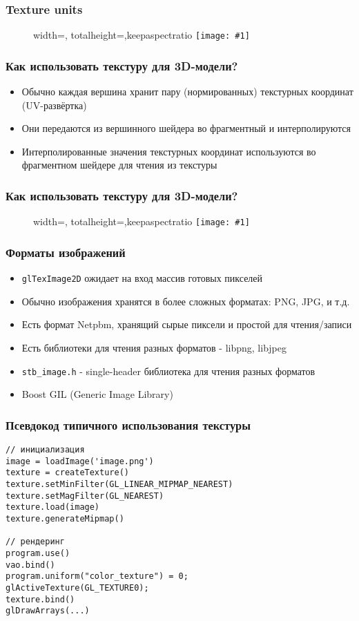 \documentclass{beamer}
\newcommand{\slideimage}[1]{
  \begin{figure}
    \begin{adjustbox}{width=\textwidth, totalheight=\textheight-2\baselineskip-2\baselineskip,keepaspectratio}
      \texttt{[image: \#1]}
    \end{adjustbox}
  \end{figure}
}
\begin{document}
\begin{frame}[fragile]
\frametitle{Texture units}
\slideimage{texture_units.png}
\end{frame}

\begin{frame}[fragile]
\frametitle{Как использовать текстуру для 3D-модели?}
\begin{itemize}
\item Обычно каждая вершина хранит пару (нормированных) текстурных координат (UV-развёртка)
\pause
\item Они передаются из вершинного шейдера во фрагментный и интерполируются
\pause
\item Интерполированные значения текстурных координат используются во фрагментном шейдере для чтения из текстуры
\end{itemize}
\end{frame}

\begin{frame}[fragile]
\frametitle{Как использовать текстуру для 3D-модели?}
\slideimage{uvs.png}
\end{frame}

\begin{frame}[fragile]
\frametitle{Форматы изображений}
\begin{itemize}
\item \verb|glTexImage2D| ожидает на вход массив готовых пикселей
\pause
\item Обычно изображения хранятся в более сложных форматах: PNG, JPG, и т.д.
\pause
\item Есть формат Netpbm, хранящий сырые пиксели и простой для чтения/записи
\pause
\item Есть библиотеки для чтения разных форматов - libpng, libjpeg
\pause
\item \verb|stb_image.h| - single-header библиотека для чтения разных форматов
\pause
\item Boost GIL (Generic Image Library)
\end{itemize}
\end{frame}

\begin{frame}[fragile]
\frametitle{Псевдокод типичного использования текстуры}
\begin{verbatim}
// инициализация
image = loadImage('image.png')
texture = createTexture()
texture.setMinFilter(GL_LINEAR_MIPMAP_NEAREST)
texture.setMagFilter(GL_NEAREST)
texture.load(image)
texture.generateMipmap()

// рендеринг
program.use()
vao.bind()
program.uniform("color_texture") = 0;
glActiveTexture(GL_TEXTURE0);
texture.bind()
glDrawArrays(...)
\end{verbatim}
\end{frame}
\end{document}
